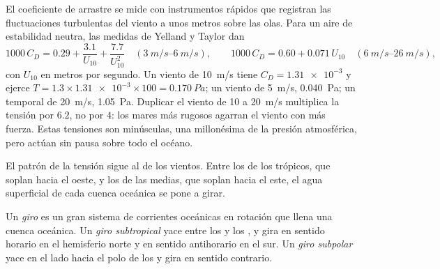 El coeficiente de arrastre se mide con instrumentos rápidos que registran las fluctuaciones turbulentas del viento a unos metros sobre las olas. Para un aire de estabilidad neutra, las medidas de Yelland y Taylor dan
\[
  1000\,C_D = 0.29 + \frac{3.1}{U_{10}} + \frac{7.7}{U_{10}^2}
  \quad (\qtyrange{3}{6}{m/s}),
  \qquad
  1000\,C_D = 0.60 + 0.071\,U_{10}
  \quad (\qtyrange{6}{26}{m/s}),
\]
con $U_{10}$ en metros por segundo. Un viento de \qty{10}{m/s} tiene $C_D =
\num{1.31e-3}$ y ejerce $T = 1.3 \times \num{1.31e-3} \times 100 =
\qty{0.170}{Pa}$; un viento de \qty{5}{m/s}, \qty{0.040}{Pa}; un temporal de
\qty{20}{m/s}, \qty{1.05}{Pa}. Duplicar el viento de 10 a \qty{20}{m/s} multiplica la tensión por $6.2$, no por $4$: los mares más rugosos agarran el viento con más fuerza. Estas tensiones son minúsculas, una millonésima de la presión atmosférica, pero actúan sin pausa sobre todo el océano.

El patrón de la tensión sigue al de los vientos. Entre los  de los trópicos, que soplan hacia el oeste, y los  de las  medias, que soplan hacia el este, el agua superficial de cada cuenca oceánica se pone a girar.

\begin{definition}\label{def:b1:ocean-circulation:gyre}
Un \emph{giro} es un gran sistema de corrientes oceánicas en rotación que llena una cuenca oceánica. Un \emph{giro subtropical} yace entre los  y los , y gira en sentido horario en el hemisferio norte y en sentido antihorario en el sur. Un \emph{giro subpolar} yace en el lado hacia el polo de los  y gira en sentido contrario.
\end{definition}

